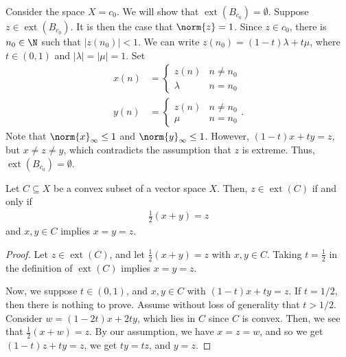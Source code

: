 \documentclass[10pt]{mypackage}
\begin{document}
\begin{example}
  Consider the space $X = c_0$. We will show that $\operatorname{ext}\left(B_{c_0}\right) = \emptyset$. Suppose $z\in \operatorname{ext}\left(B_{c_0}\right)$. It is then the case that $\norm{z} = 1$. Since $z\in c_0$, there is $n_0\in \N$ such that $\left\vert z\left(n_0\right) \right\vert < 1$. We can write $z\left(n_0\right) = \left(1-t\right)\lambda + t\mu$, where $t\in \left(0,1\right)$ and $\left\vert \lambda \right\vert = \left\vert \mu \right\vert = 1$. Set
  \begin{align*}
    x(n) &= \begin{cases}
      z(n) & n\neq n_0\\
      \lambda & n=n_0
    \end{cases}\\
      y(n) &= \begin{cases}
        z(n) & n\neq n_0\\
        \mu & n = n_0
      \end{cases}.
  \end{align*}
  Note that $\norm{x}_{\infty} \leq 1$ and $\norm{y}_{\infty} \leq 1$. However, $\left(1-t\right)x + ty = z$, but $x\neq z \neq y$, which contradicts the assumption that $z$ is extreme. Thus, $\operatorname{ext}\left(B_{c_0}\right) = \emptyset$.
\end{example}
\begin{lemma}
  Let $C\subseteq X$ be a convex subset of a vector space $X$. Then, $z\in \operatorname{ext}(C)$ if and only if
  \begin{align*}
    \frac{1}{2}\left(x+y\right) = z
  \end{align*}
  and $x,y\in C$ implies $x = y = z$.
\end{lemma}
\begin{proof}
  Let $z\in \operatorname{ext}\left(C\right)$, and let $\frac{1}{2}\left(x+y\right) = z$ with $x,y\in C$. Taking $t = \frac{1}{2}$ in the definition of $\operatorname{ext}\left(C\right)$ implies $x = y = z$.\newline

  Now, we suppose $t\in (0,1)$, and $x,y\in C$ with $\left(1-t\right)x + ty = z$. If $t = 1/2$, then there is nothing to prove. Assume without loss of generality that $t > 1/2$. Consider $w = \left(1-2t\right)x + 2ty$, which lies in $C$ since $C$ is convex. Then, we see that $\frac{1}{2}\left(x+w\right) = z$. By our assumption, we have $x = z = w$, and so we get $\left(1-t\right)z + ty = z$, we get $ty = tz$, and $y = z$.
\end{proof}
\end{document}
